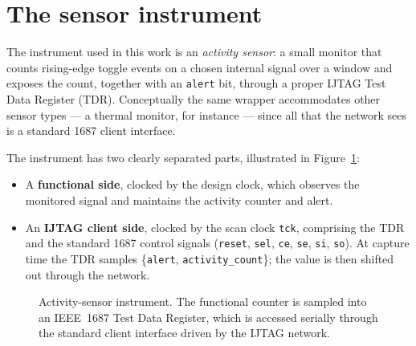 \section{The sensor instrument}
\label{sec:ij-sensor}

The instrument used in this work is an \emph{activity sensor}: a small monitor
that counts rising-edge toggle events on a chosen internal signal over a window
and exposes the count, together with an \texttt{alert} bit, through a proper
IJTAG Test Data Register (TDR). Conceptually the same wrapper accommodates other
sensor types --- a thermal monitor, for instance --- since all that the network
sees is a standard 1687 client interface.

The instrument has two clearly separated parts, illustrated in
Figure~\ref{fig:sensor}:

\begin{itemize}
  \item A \textbf{functional side}, clocked by the design clock, which observes
        the monitored signal and maintains the activity counter and alert.
  \item An \textbf{IJTAG client side}, clocked by the scan clock \texttt{tck},
        comprising the TDR and the standard 1687 control signals
        (\texttt{reset}, \texttt{sel}, \texttt{ce}, \texttt{se}, \texttt{si},
        \texttt{so}). At capture time the TDR samples \{\texttt{alert},
        \texttt{activity\_count}\}; the value is then shifted out through the
        network.
\end{itemize}

\begin{figure}[htbp]
\centering
{}
\caption{Activity-sensor instrument. The functional counter is sampled into an
IEEE~1687 Test Data Register, which is accessed serially through the standard
client interface driven by the IJTAG network.}
\label{fig:sensor}
\end{figure}

